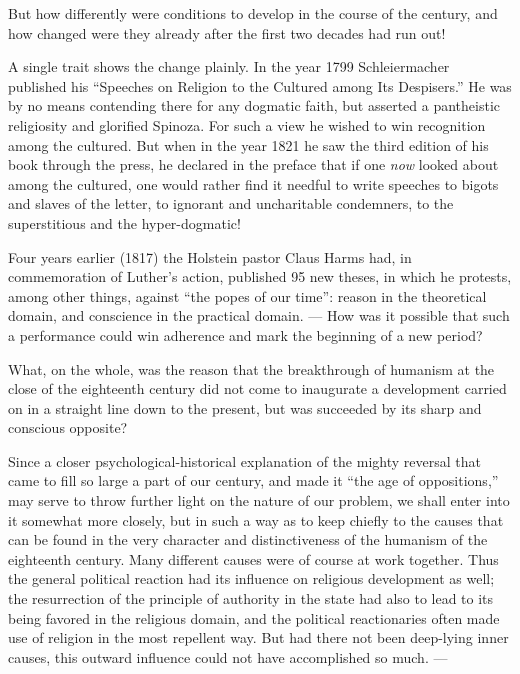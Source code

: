 \documentclass[12pt,a4paper,openany]{book}
\newcommand{\opage}[1]{\marginnote{\footnotesize\textit{[#1]}}}
\begin{document}
But how differently were conditions to develop in the course of the century,
and how changed were they already after the first two decades had run out!

A single trait shows the change plainly. In the year 1799 Schleiermacher
published his ``Speeches on Religion to the Cultured among Its Despisers.'' He was by
no means contending there for any dogmatic faith, but asserted a pantheistic
religiosity and glorified Spinoza. For such a view he wished to win
recognition among the cultured. But when in the year 1821 he saw the third
edition of his book through the press, he declared in the preface that if one
\emph{now} looked about among the cultured, one would rather find it needful to write
speeches to bigots and slaves of the letter, to ignorant and uncharitable
condemners, to the superstitious and the hyper-dogmatic!

Four years earlier (1817) the Holstein pastor Claus Harms had, in commemoration
of Luther's action, published 95 new theses, in which he protests, among other
things, against ``the popes of our time'': reason in the theoretical domain,
and conscience in the practical domain. --- How was it possible that such a
performance could win adherence and mark the beginning of a new period?

What, on the whole, was the reason that the breakthrough of humanism at the
close of the eighteenth century did not come to inaugurate a development
carried on in a straight line down to the present, but was succeeded by its
sharp and conscious opposite?

Since a closer psychological-historical explanation of the mighty reversal
that came to fill so large a part of
\opage{203}our century, and made it ``the age of
oppositions,'' may serve to throw further light on the nature of our problem,
we shall enter into it somewhat more closely, but in such a way as to keep
chiefly to the causes that can be found in the very character and
distinctiveness of the humanism of the eighteenth century. Many different
causes were of course at work together. Thus the general political reaction
had its influence on religious development as well; the resurrection of the
principle of authority in the state had also to lead to its being favored in
the religious domain, and the political reactionaries often made use of
religion in the most repellent way. But had there not been deep-lying inner
causes, this outward influence could not have accomplished so much. ---
\end{document}
